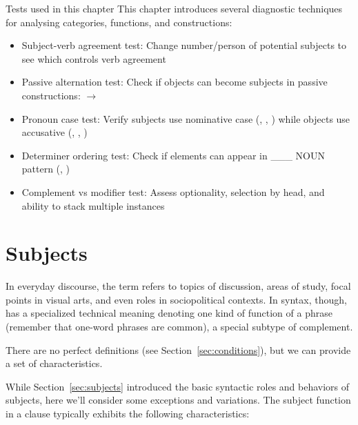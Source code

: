 \begin{tblsfilled}{Tests used in this chapter}
This chapter introduces several diagnostic techniques for analysing categories, functions, and constructions:
\begin{itemize}[noitemsep, leftmargin=*]
    \item Subject-verb agreement test: Change number/person of potential subjects to see which controls verb agreement
    \item Passive alternation test: Check if objects can become subjects in passive constructions:  $\rightarrow$ 
    \item Pronoun case test: Verify subjects use nominative case (, , ) while objects use accusative (, , )
    \item Determiner ordering test: Check if elements can appear in \_\_\_  NOUN pattern (, )
    \item Complement vs modifier test: Assess optionality, selection by head, and ability to stack multiple instances
\end{itemize}
\end{tblsfilled}


\section{Subjects} \label{sec:subjects2}
In everyday discourse, the term  refers to topics of discussion, areas of study, focal points in visual arts, and even roles in sociopolitical contexts. In syntax, though,  has a specialized technical meaning denoting one kind of function of a phrase (remember that one-word phrases are common), a special subtype of complement.

There are no perfect definitions (see Section~\ref{sec:conditions}), but we can provide a set of characteristics.

While Section~\ref{sec:subjects} introduced the basic syntactic roles and behaviors of subjects, here we'll consider some exceptions and variations. The subject function in a clause typically exhibits the following characteristics:

